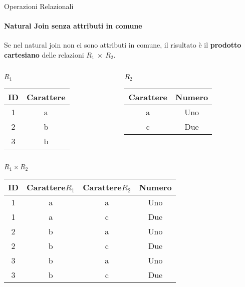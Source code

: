     \begin{frame}{Operazioni Relazionali}
        \framesubtitle{Natural Join senza attributi in comune}
        Se nel natural join non ci sono attributi in comune, il risultato \`e il \textbf{prodotto cartesiano} delle relazioni $R_1~\times~R_2$.
        \begin{columns}
            \begin{column}{0.48\textwidth}
                \centering
                {\small $R_1$}
                \newline
        \begin{tabular}{|c|c|}
            \hline
            \rowcolor{cyan!30}ID & Carattere \\
            \hline
            1 & a \\ \hline
            2 & b \\ \hline
            3 & b \\ \hline
            \end{tabular}
            \end{column}
            \begin{column}{0.48\textwidth}
                \centering
                {\small $R_2$}
                \newline
                \begin{tabular}{|c|c|}
                    \hline
                    \rowcolor{cyan!30} Carattere & Numero \\ \hline
                    a & Uno \\ \hline
                    c & Due \\ \hline
                    \end{tabular}
            \end{column}
        \end{columns}
        \vspace{.1cm}
        \centering
        \pause
        {\small $R_1 \times R_2$
        \begin{tabular}{|c|c|c|c|}
            \hline
            \rowcolor{cyan!30} ID & Carattere$R_1$ & Carattere$R_2$ & Numero \\ \hline
            1 & a & a & Uno \\ \hline
            1 & a & c & Due \\ \hline
            2 & b & a & Uno \\ \hline
            2 & b & c & Due \\ \hline
            3 & b & a & Uno \\ \hline
            3 & b & c & Due \\ \hline
            \end{tabular}}
    \end{frame}
